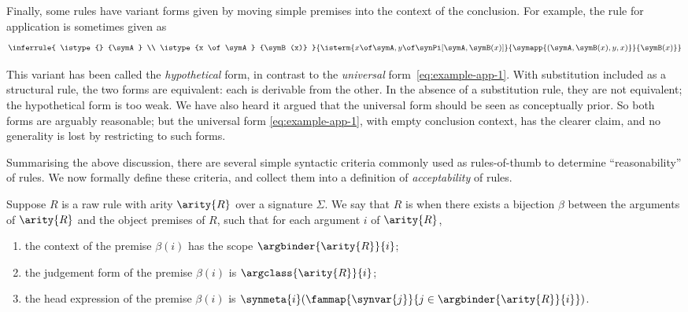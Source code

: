 Finally, some rules have variant forms given by moving simple premises into the context of the conclusion.
%
For example, the rule for application is sometimes given as
%
\begin{equation}
\label{eq:example-app-6}
\inferrule{
  \istype {} {\symA} \\ 
  \istype {x \of \symA} {\symB(x)}
}{
 \isterm
   {x \of \symA, y \of \synPi[\symA, \symB(x)]}
   {\symapp{(\symA,\symB(x),y,x)}}
   {\symB(x)}
}
\end{equation}

This variant has been called the \emph{hypothetical} form, in contrast to the \emph{universal} form~\eqref{eq:example-app-1}.
%
With substitution included as a structural rule, the two forms are equivalent: each is derivable from the other.
%
In the absence of a substitution rule, they are not equivalent; the hypothetical form is too weak.
%
We have also heard it argued that the universal form should be seen as conceptually prior.
%
So both forms are arguably reasonable; but the universal form \eqref{eq:example-app-1}, with empty conclusion context, has the clearer claim, and no generality is lost by restricting to such forms.

Summarising the above discussion, there are several simple syntactic criteria commonly used as rules-of-thumb to determine “reasonability” of rules.
%
We now formally define these criteria, and collect them into a definition of \emph{acceptability} of rules.

\begin{definition}
  \label{def:tight-rule}%
  Suppose $R$ is a raw rule with arity $\arity{R}$ over a signature $\Sigma$. We say that $R$ is  when
  there exists a bijection $\beta$ between the arguments of $\arity{R}$ and the object premises of $R$,
  such that for each argument $i$ of $\arity{R}$,
  \begin{enumerate}
    \item\label{item:tight-rule-ctx} the context of the premise $\beta(i)$ has the scope $\argbinder{\arity{R}}{i}$;
    \item\label{item:tight-rule-jf} the judgement form of the premise $\beta(i)$ is $\argclass{\arity{R}}{i}$;
    \item\label{item:tight-rule-hd} the head expression of the premise $\beta(i)$ is $\synmeta{i}(\fammap{\synvar{j}}{j \in \argbinder{\arity{R}}{i}})$.
  \end{enumerate}
\end{definition}

